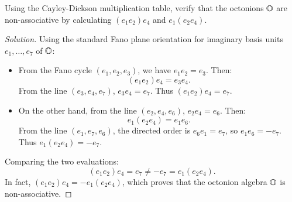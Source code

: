 \begin{problem}
Using the Cayley-Dickson multiplication table, verify that the octonions $\mathbb{O}$ are non-associative by calculating $(e_1 e_2)e_4$ and $e_1(e_2 e_4)$.
\end{problem}

\begin{proof}[Solution]
Using the standard Fano plane orientation for imaginary basis units $e_1, \dots, e_7$ of $\mathbb{O}$:
\begin{itemize}[leftmargin=1.5em, itemsep=4pt]
    \item From the Fano cycle $(e_1, e_2, e_3)$, we have $e_1 e_2 = e_3$.
    Then:
    \begin{equation*}
    (e_1 e_2)e_4 = e_3 e_4.
    \end{equation*}
    From the line $(e_3, e_4, e_7)$, $e_3 e_4 = e_7$.
    Thus $(e_1 e_2)e_4 = e_7$.

    \item On the other hand, from the line $(e_2, e_4, e_6)$, $e_2 e_4 = e_6$.
    Then:
    \begin{equation*}
    e_1(e_2 e_4) = e_1 e_6.
    \end{equation*}
    From the line $(e_1, e_7, e_6)$, the directed order is $e_6 e_1 = e_7$, so $e_1 e_6 = -e_7$.
    Thus $e_1(e_2 e_4) = -e_7$.
\end{itemize}
Comparing the two evaluations:
\begin{equation*}
(e_1 e_2)e_4 = e_7 \ne -e_7 = e_1(e_2 e_4).
\end{equation*}
In fact, $(e_1 e_2)e_4 = -e_1(e_2 e_4)$, which proves that the octonion algebra $\mathbb{O}$ is non-associative.
\end{proof}
